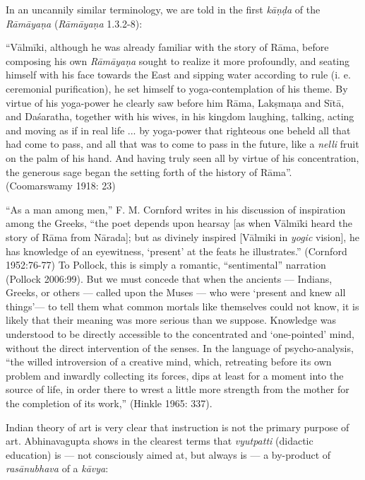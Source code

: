 In an uncannily similar terminology, we are told in the first {\sl kāṇḍa} of the {\sl Rāmāyaṇa} ({\sl Rāmāyaṇa} 1.3.2-8):

\begin{myquote}
“Vālmīki, although he was already familiar with the story of Rāma, before composing his own {\sl Rāmāyaṇa} sought to realize it more profoundly, and seating himself with his face towards the East and sipping water according to rule (i. e. ceremonial purification), he set himself to yoga-contemplation of his theme. By virtue of his yoga-power he clearly saw before him Rāma, Lakṣmaṇa and Sītā, and Daśaratha, together with his wives, in his kingdom laughing, talking, acting and moving as if in real life ... by yoga-power that righteous one beheld all that had come to pass, and all that was to come to pass in the future, like a {\sl nelli} fruit on the palm of his hand. And having truly seen all by virtue of his concentration, the generous sage began the setting forth of the history of Rāma”.   
\hfill (Coomarswamy 1918: 23)
\end{myquote}

“As a man among men,” F. M. Cornford writes in his discussion of inspiration among the Greeks, “the poet depends upon hearsay [as when Vālmīki heard the story of Rāma from Nārada]; but as divinely inspired [Vālmiki in {\sl yogic} vision], he has knowledge of an eyewitness, ‘present’ at the feats he illustrates.” (Cornford 1952:76-77) To Pollock, this is simply a romantic, “sentimental” narration (Pollock 2006:99). But we must concede that when the ancients — Indians, Greeks, or others — called upon the Muses — who were ‘present and knew all things’— to tell them what common mortals like themselves could not know, it is likely that their meaning was more serious than we suppose. Knowledge was understood to be directly accessible to the concentrated and ‘one-pointed’ mind, without the direct intervention of the senses. In the language of psycho-analysis,  “the willed introversion of a creative mind, which, retreating before its own problem and inwardly collecting its forces, dips at least for a moment into the source of life, in order there to wrest a little more strength from the mother for the completion of its work,” (Hinkle 1965: 337). 

Indian theory of art is very clear that instruction is not the primary purpose of art. Abhinavagupta shows in the clearest terms that {\sl vyutpatti} (didactic education) is — not consciously aimed at, but always is — a by-product of {\sl rasānubhava} of a {\sl kāvya}:

